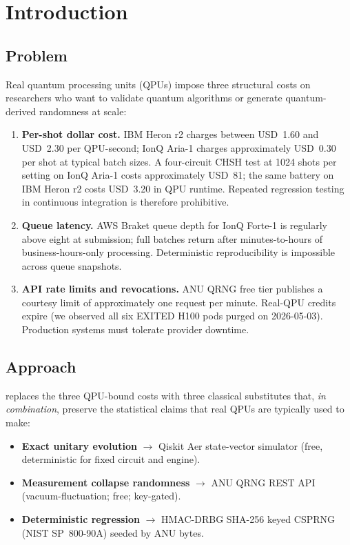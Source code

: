 \section{Introduction}\label{sec:intro}

\subsection{Problem}

Real quantum processing units (QPUs) impose three structural costs on
researchers who want to validate quantum algorithms or generate
quantum-derived randomness at scale:

\begin{enumerate}
\item \textbf{Per-shot dollar cost.} IBM Heron r2 charges between
  USD~1.60 and USD~2.30 per QPU-second; IonQ Aria-1 charges
  approximately USD~0.30 per shot at typical batch sizes. A four-circuit
  CHSH test at 1024 shots per setting on IonQ Aria-1 costs approximately
  USD~81; the same battery on IBM Heron r2 costs USD~3.20 in QPU
  runtime. Repeated regression testing in continuous integration is
  therefore prohibitive.
\item \textbf{Queue latency.} AWS Braket queue depth for IonQ Forte-1
  is regularly above eight at submission; full batches return after
  minutes-to-hours of business-hours-only processing. Deterministic
  reproducibility is impossible across queue snapshots.
\item \textbf{API rate limits and revocations.} ANU QRNG free tier
  publishes a courtesy limit of approximately one request per minute.
  Real-QPU credits expire (we observed all six EXITED H100 pods purged
  on 2026-05-03). Production systems must tolerate provider downtime.
\end{enumerate}

\subsection{Approach}

\qmirror{} replaces the three QPU-bound costs with three classical
substitutes that, \emph{in combination}, preserve the statistical
claims that real QPUs are typically used to make:

\begin{itemize}
\item \textbf{Exact unitary evolution} $\rightarrow$ Qiskit Aer
  state-vector simulator (free, deterministic for fixed circuit and
  engine).
\item \textbf{Measurement collapse randomness} $\rightarrow$ ANU QRNG
  REST API (vacuum-fluctuation; free; key-gated).
\item \textbf{Deterministic regression} $\rightarrow$ HMAC-DRBG
  SHA-256 keyed CSPRNG (NIST SP~800-90A) seeded by ANU bytes.
\end{itemize}

